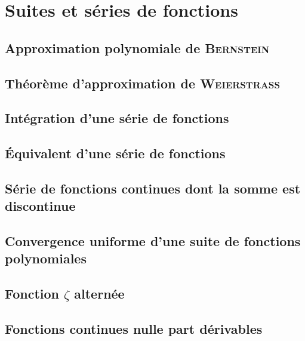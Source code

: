 \chapter{Suites et séries de fonctions}

\section{Approximation polynomiale de \textsc{Bernstein}}


\section{Théorème d'approximation de \textsc{Weierstrass}}


\section{Intégration d'une série de fonctions}


\section{Équivalent d'une série de fonctions}


\section{Série de fonctions continues dont la somme est discontinue}


\section{Convergence uniforme d'une suite de fonctions polynomiales}


\section{Fonction \texorpdfstring{$\zeta$}{zêta} alternée}


\section{Fonctions continues nulle part dérivables}

